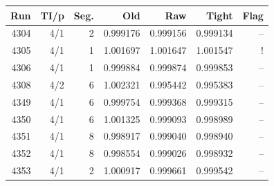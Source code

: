 \begin{tabular}{rrrrrrr}\toprule Run & TI/p & Seg. & Old & Raw & Tight & Flag\\\midrule
4304 & 4/1 & 2 & 0.999176 & 0.999156 & 0.999134 & --\\
4305 & 4/1 & 1 & 1.001697 & 1.001647 & 1.001547 & !\\
4306 & 4/1 & 1 & 0.999884 & 0.999874 & 0.999853 & --\\
4308 & 4/2 & 6 & 1.002321 & 0.995442 & 0.995383 & --\\
4349 & 4/1 & 6 & 0.999754 & 0.999368 & 0.999315 & --\\
4350 & 4/1 & 6 & 1.001325 & 0.999093 & 0.998989 & --\\
4351 & 4/1 & 8 & 0.998917 & 0.999040 & 0.998940 & --\\
4352 & 4/1 & 8 & 0.998554 & 0.999026 & 0.998932 & --\\
4353 & 4/1 & 2 & 1.000917 & 0.999661 & 0.999542 & --\\
\bottomrule\end{tabular}